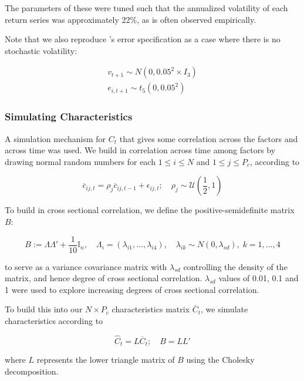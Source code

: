 \documentclass[11pt, a4paper, table]{article}
\begin{document}
The parameters of these were tuned such that the annualized volatility of each return series was approximately 22\%, as is often observed empirically.

Note that we also reproduce \cite{gu_empirical_2018}'s error specification as a case where there is no stochastic volatility:

\begin{align}
	v_{t+1} \sim N(0, 0.05^2 \times I_3) \\
	e_{i, t+1} \sim t_5(0, 0.05^2)
\end{align}

\subsubsection{Simulating Characteristics}

A simulation mechanism for $C_t$ that gives some correlation across the factors and across time was used. We build in correlation across time among factors by drawing normal random numbers for each $1\leq i\leq N$ and $1\leq j\leq P_{c}$, according to 

\begin{equation}
	\overline{c}_{i j, t} = \rho_{j} \overline{c}_{i j, t-1}+\epsilon_{i j, t} ;
	\quad \rho_{j} \sim \mathcal{U} \left( \frac{1}{2},1 \right) 
\end{equation}

To build in cross sectional correlation, we define the positive-semidefinite matrix $B$:

\begin{equation}
	B:=\Lambda\Lambda' + \frac{1}{10}\mathbb{I}_{n}, \quad
	\Lambda_i = (\lambda_{i1},\dots,\lambda_{i4}), \quad
	\lambda_{ik}\sim N(0, \lambda_{sd}), \; k=1, \dots, 4
\end{equation}

to serve as a variance covariance matrix with $\lambda_{sd}$ controlling the density of the matrix, and hence degree of cross sectional correlation. $\lambda_{sd}$ values of 0.01, 0.1 and 1 were used to explore increasing degrees of cross sectional correlation.

To build this into our $N\times P_{c}$ characteristics matrix $\bar{C}_t$, we simulate characteristics according to
 
\begin{equation}
	\widehat{C}_{t}=L\overline{C}_{t} ; \quad B = LL' 
\end{equation}

where $L$ represents the lower triangle matrix of $B$ using the Cholesky decomposition.
 
\end{document}
